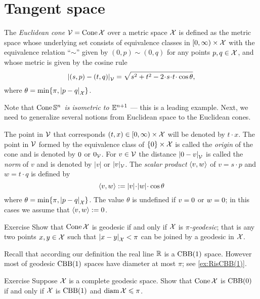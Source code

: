 \section{Tangent space}\label{sec: tangent space}

The \emph{Euclidean cone} $\mathcal{V}=\mathop{\rm Cone}\nolimits\mathcal{X}$ 
over a metric space $\mathcal{X}$
is defined as the metric space whose underlying set consists of
equivalence classes in
$[0,\infty)\times \mathcal{X}$ with the equivalence relation ``$\sim$'' given by $(0,p)\sim (0,q)$ for any points $p,q\in\mathcal{X}$,
and whose metric is given by the cosine rule
\[
\dist{(s,p)}{(t,q)}{\spc{V}} 
=
\sqrt{s^2+t^2-2\cdot s\cdot t\cdot \cos\theta},
\]
where $\theta= \min\{\pi, \dist{p}{q}{\spc{X}}\}$.

Note that \textit{$\mathop{\rm Cone}\nolimits\mathbb{S}^n$ is isometric to $\mathbb{E}^{n+1}$} --- this is a leading example.
Next, we need to generalize several notions from Euclidean space to the Euclidean cones. 

The point in $\mathcal{V}$ that corresponds $(t,x)\z\in[0,\infty)\times \spc{X}$ will be denoted by $t\cdot x$.
The point in $\mathcal{V}$ formed by the equivalence class of $\{0\}\times\mathcal{X}$ is called the \emph{origin} of the cone and is denoted by $0$ or $0_{\mathcal{V}}$.
For $v\in\mathcal{V}$ the distance $\dist{\0}{v}{\spc{V}}$ is called the \emph{norm} of $v$ and is denoted by $|v|$ or $|v|_{\mathcal{V}}$.
The \emph{scalar product} $\langle v,w\rangle$
of $v=s\cdot p$ and $w=t\cdot q$
is defined by 
\[\<v,w\>
\df |v|\cdot|w|\cdot\cos\theta
\]
where $\theta= \min\{\pi, \dist{p}{q}{\spc{X}}\}$.
The value $\theta$ is undefined if $v=0$ or $w=0$;
in this cases we assume that $\langle v,w\rangle\mathrel{:=}0$.

\begin{thm}{Exercise}
Show that $\mathop{\rm Cone}\nolimits\mathcal{X}$ is geodesic if and only if $\mathcal{X}$ is \emph{$\pi$-geodesic};
that is any two points $x,y\in \mathcal{X}$ such that $\dist{x}{y}{\spc{X}}<\pi$ can be joined by a geodesic in $\mathcal{X}$.
\end{thm}

Recall that according our definition the real line $\mathbb{R}$ is a $\mathrm{CBB}(1)$ space.
However most of geodesic $\mathrm{CBB}(1)$ spaces have diameter at most $\pi$;
see \ref{ex:RisCBB(1)}.

\begin{thm}{Exercise}
Suppose $\mathcal{X}$ is a complete geodesic space.
Show that $\mathop{\rm Cone}\nolimits\mathcal{X}$ is $\mathrm{CBB}(0)$ if and only if $\mathcal{X}$ is $\mathrm{CBB}(1)$ and $\operatorname{\rm diam}\nolimits\mathcal{X}\leqslant \pi$.
\end{thm}




